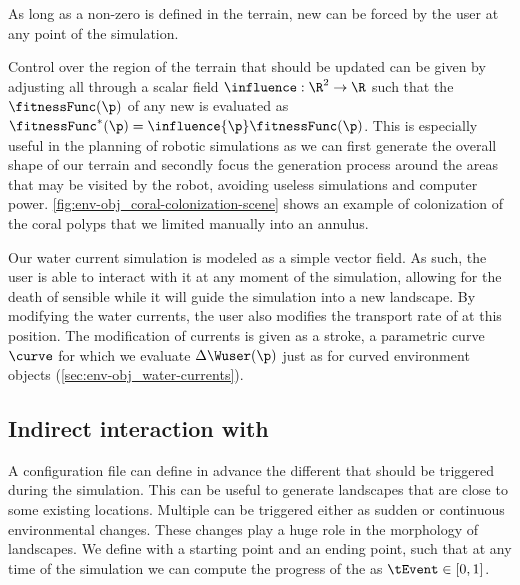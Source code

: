 As long as a non-zero  is defined in the terrain, new  can be forced by the user at any point of the simulation. 

Control over the region of the terrain that should be updated can be given by adjusting all  through a scalar field $\influence: \R^2 \to \R $ such that the  $\fitnessFunc(\p)$ of any new  is evaluated as $\fitnessFunc^*(\p) = \influence{\p} \fitnessFunc(\p)$. This is especially useful in the planning of robotic simulations as we can first generate the overall shape of our terrain and secondly focus the generation process around the areas that may be visited by the robot, avoiding useless simulations and computer power. 
\cref{fig:env-obj_coral-colonization-scene} shows an example of colonization of the coral polyps that we limited manually into an annulus.



Our water current simulation is modeled as a simple vector field. As such, the user is able to interact with it at any moment of the simulation, allowing for the death of sensible  while it will guide the simulation into a new landscape. By modifying the water currents, the user also modifies the transport rate of  at this position. The modification of currents is given as a stroke, a parametric curve $\curve$ for which we evaluate $\Delta \Wuser(\p)$ just as for curved environment objects (\cref{sec:env-obj_water-currents}).

\subsection{Indirect interaction with }
\label{sec:env-obj_events}
A configuration file can define in advance the different  that should be triggered during the simulation. This can be useful to generate landscapes that are close to some existing locations. 
Multiple  can be triggered either as sudden or continuous environmental changes. These changes play a huge role in the morphology of landscapes.
We define  with a starting point and an ending point, such that at any time of the simulation we can compute the progress of the  as $\tEvent \in [0, 1]$.

